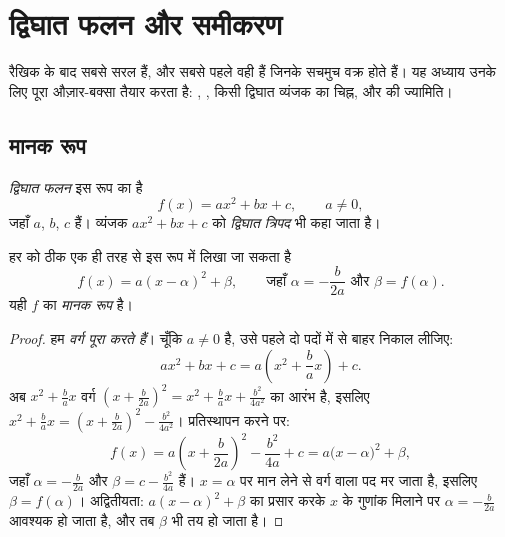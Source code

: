 \chapter{द्विघात फलन और समीकरण}\label{ch:g11:quad}

रैखिक  के बाद सबसे सरल   हैं, और सबसे पहले वही हैं जिनके
 सचमुच वक्र होते हैं। यह अध्याय उनके लिए पूरा औज़ार-बक्सा तैयार करता है:
, , किसी द्विघात व्यंजक का चिह्न, और  की ज्यामिति।

\section{मानक रूप}

\begin{definition}[द्विघात फलन]\label{def:g11:quad:quadratic}
\emph{द्विघात फलन} इस रूप का  है
\[
f(x) = ax^2 + bx + c, \qquad a \neq 0,
\]
जहाँ $a$, $b$, $c$  हैं। व्यंजक $ax^2 + bx + c$ को \emph{द्विघात
त्रिपद} भी कहा जाता है।
\end{definition}

\begin{theorem}[मानक रूप]\label{thm:g11:quad:canonical}
हर  को ठीक एक ही तरह से इस रूप में लिखा जा सकता है
\[
f(x) = a(x - \alpha)^2 + \beta,
\qquad\text{जहाँ } \alpha = -\frac{b}{2a} \text{ और } \beta = f(\alpha).
\]
यही $f$ का \emph{मानक रूप} है।
\end{theorem}

\begin{proof}
हम \emph{वर्ग पूरा करते हैं}। चूँकि $a \neq 0$ है, उसे पहले दो पदों में से बाहर
निकाल लीजिए:
\[
ax^2 + bx + c = a\left(x^2 + \frac{b}{a}x\right) + c .
\]
अब $x^2 + \frac{b}{a}x$ वर्ग $\left(x + \frac{b}{2a}\right)^2 = x^2 + \frac ba x + \frac{b^2}{4a^2}$ का आरंभ है, इसलिए $x^2 + \frac{b}{a}x = \left(x + \frac{b}{2a}\right)^2 -
\frac{b^2}{4a^2}$। प्रतिस्थापन करने पर:
\[
f(x) = a\left(x + \frac{b}{2a}\right)^2 - \frac{b^2}{4a} + c
= a\bigl(x - \alpha\bigr)^2 + \beta,
\]
जहाँ $\alpha = -\frac{b}{2a}$ और $\beta = c - \frac{b^2}{4a}$ हैं। $x = \alpha$ पर मान लेने से वर्ग वाला पद मर जाता है, इसलिए
$\beta = f(\alpha)$। अद्वितीयता: $a(x-\alpha)^2 + \beta$ का प्रसार करके $x$ के गुणांक मिलाने पर $\alpha = -\frac{b}{2a}$ आवश्यक
हो जाता है, और तब $\beta$ भी तय हो जाता है।
\end{proof}

